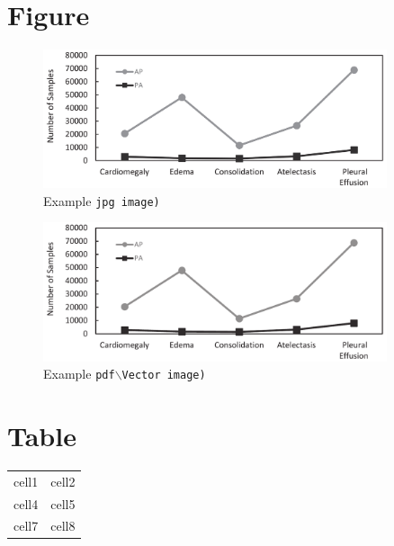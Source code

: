 \documentclass{article}
\begin{document}
\section{Figure}

\begin{figure}[h]
\caption{Example \tt{jpg} image)}
\centering
\includegraphics[width=0.9\textwidth]{observation_ap_pa_distribution.png}
\end{figure}
 
\begin{figure}[h]
\caption{Example \tt{pdf$\backslash$Vector} image)}
\centering
\includegraphics[width=0.9\textwidth]{observation_ap_pa_distribution.pdf}
\end{figure}

\section{Table}


\begin{table}[h]
\centering
\begin{tabular}{ |c c| }
\hline
 cell1 & cell2 \\ 
 cell4 & cell5 \\  
 cell7 & cell8 \\
\hline
\end{tabular}
\end{table}
\end{document}
